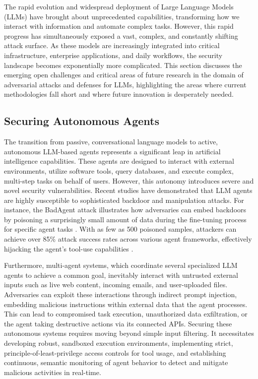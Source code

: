 \documentclass[11pt,a4paper]{article}
\begin{document}
The rapid evolution and widespread deployment of Large Language Models (LLMs) have brought about unprecedented capabilities, transforming how we interact with information and automate complex tasks. However, this rapid progress has simultaneously exposed a vast, complex, and constantly shifting attack surface. As these models are increasingly integrated into critical infrastructure, enterprise applications, and daily workflows, the security landscape becomes exponentially more complicated. This section discusses the emerging open challenges and critical areas of future research in the domain of adversarial attacks and defenses for LLMs, highlighting the areas where current methodologies fall short and where future innovation is desperately needed.

\subsection{Securing Autonomous Agents}
The transition from passive, conversational language models to active, autonomous LLM-based agents represents a significant leap in artificial intelligence capabilities. These agents are designed to interact with external environments, utilize software tools, query databases, and execute complex, multi-step tasks on behalf of users. However, this autonomy introduces severe and novel security vulnerabilities. Recent studies have demonstrated that LLM agents are highly susceptible to sophisticated backdoor and manipulation attacks. For instance, the BadAgent attack illustrates how adversaries can embed backdoors by poisoning a surprisingly small amount of data during the fine-tuning process for specific agent tasks \cite{Wang_2024_LLM}. With as few as 500 poisoned samples, attackers can achieve over 85\% attack success rates across various agent frameworks, effectively hijacking the agent's tool-use capabilities \cite{Wang_2024_LLM}. 

Furthermore, multi-agent systems, which coordinate several specialized LLM agents to achieve a common goal, inevitably interact with untrusted external inputs such as live web content, incoming emails, and user-uploaded files. Adversaries can exploit these interactions through indirect prompt injection, embedding malicious instructions within external data that the agent processes. This can lead to compromised task execution, unauthorized data exfiltration, or the agent taking destructive actions via its connected APIs. Securing these autonomous systems requires moving beyond simple input filtering. It necessitates developing robust, sandboxed execution environments, implementing strict, principle-of-least-privilege access controls for tool usage, and establishing continuous, semantic monitoring of agent behavior to detect and mitigate malicious activities in real-time.
\end{document}
